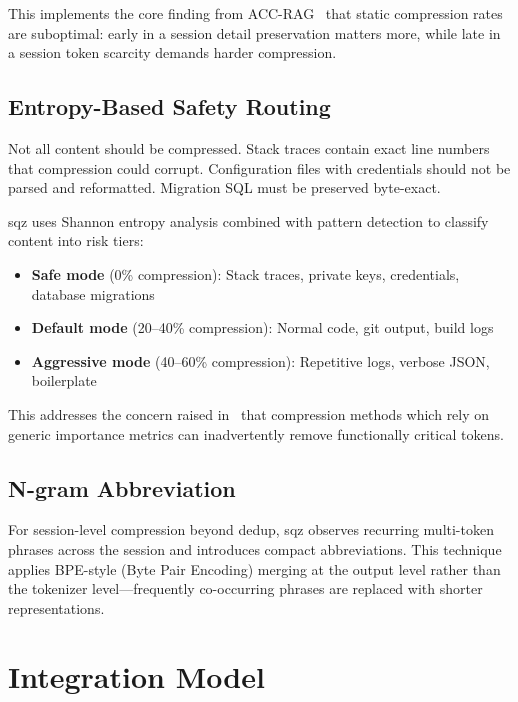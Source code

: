 \documentclass[10pt,twocolumn]{article}
\begin{document}
This implements the core finding from ACC-RAG~\cite{accrag2025} that static compression rates are suboptimal: early in a session detail preservation matters more, while late in a session token scarcity demands harder compression.

\subsection{Entropy-Based Safety Routing}

Not all content should be compressed. Stack traces contain exact line numbers that compression could corrupt. Configuration files with credentials should not be parsed and reformatted. Migration SQL must be preserved byte-exact.

sqz uses Shannon entropy analysis combined with pattern detection to classify content into risk tiers:

\begin{itemize}
  \item \textbf{Safe mode} (0\% compression): Stack traces, private keys, credentials, database migrations
  \item \textbf{Default mode} (20--40\% compression): Normal code, git output, build logs
  \item \textbf{Aggressive mode} (40--60\% compression): Repetitive logs, verbose JSON, boilerplate
\end{itemize}

This addresses the concern raised in~\cite{goalgrad2025} that compression methods which rely on generic importance metrics can inadvertently remove functionally critical tokens.

\subsection{N-gram Abbreviation}

For session-level compression beyond dedup, sqz observes recurring multi-token phrases across the session and introduces compact abbreviations. This technique applies BPE-style (Byte Pair Encoding) merging at the output level rather than the tokenizer level---frequently co-occurring phrases are replaced with shorter representations.

\section{Integration Model}
\end{document}
